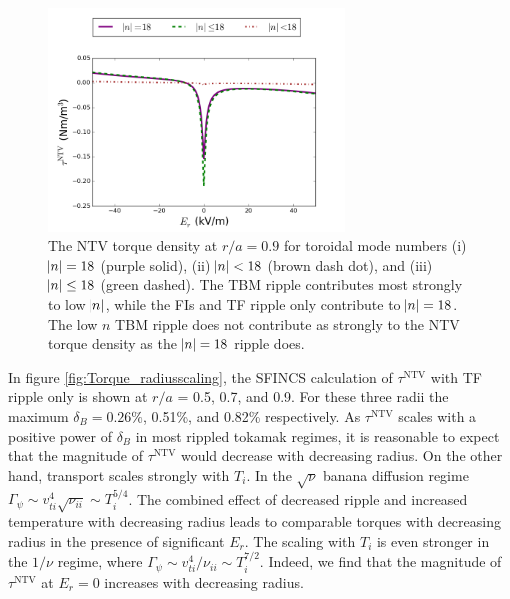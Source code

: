 \documentclass[aip, pop, preprint]{revtex4-1}
\numberwithin{figure}{section}
\numberwithin{equation}{section}
\begin{document}
\begin{figure}[h!]
\centering
\includegraphics[width=0.7\textwidth]{Torque_comparingTBMandFI.png}
\caption{\label{fig:Torque_comparingTBMandFI} The NTV torque density at $r/a = 0.9$ for toroidal mode numbers (i) $\abs{n} = 18$ (purple solid), (ii) $\abs{n} < 18$ (brown dash dot), and (iii) $\abs{n} \leq 18$ (green dashed). The TBM ripple contributes most strongly to low $\abs{n}$, while the FIs and TF ripple only contribute to $\abs{n} = 18$. The low $n$ TBM ripple does not contribute as strongly to the NTV torque density as the $\abs{n} = 18$ ripple does.}
\end{figure}

In figure \ref{fig:Torque_radiusscaling}, the SFINCS calculation of $\tau^{\text{NTV}}$ with TF ripple only is shown at $r/a$ = 0.5, 0.7, and 0.9. For these three radii the maximum $\delta_B = 0.26\%$,  0.51\%, and 0.82\% respectively. As $\tau^{\text{NTV}}$ scales with a positive power of $\delta_B$ in most rippled tokamak regimes, it is reasonable to expect that the magnitude of $\tau^{\text{NTV}}$ would decrease with decreasing radius. On the other hand, transport scales strongly with $T_i$. In the $\sqrt{\nu}$ banana diffusion regime\cite{Shaing2008} $\Gamma_{\psi} \sim v_{ti}^4 \sqrt{\nu_{ii}} \sim T_i^{5/4}$. The combined effect of decreased ripple and increased temperature with decreasing radius leads to comparable torques with decreasing radius in the presence of significant $E_r$.  The scaling with $T_i$ is even stronger in the $1/\nu$ regime,\cite{Stringer1972, Shaing2003} where $\Gamma_{\psi} \sim v_{ti}^4/\nu_{ii} \sim T_i^{7/2}$. Indeed, we find that the magnitude of $\tau^{\text{NTV}}$ at $E_r = 0$ increases with decreasing radius.
 
\end{document}
